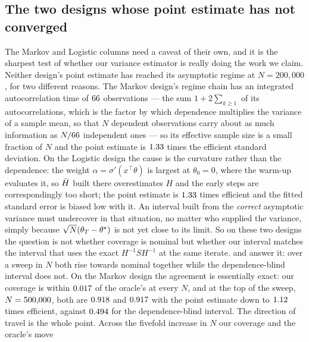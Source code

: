 
\subsection{The two designs whose point estimate has not converged}
\label{app:hard}

The Markov and Logistic columns need a caveat of their own, and it is the sharpest test of
whether our variance estimator is really doing the work we claim. Neither design's point estimate
has reached its asymptotic regime at $N=200{,}000$, for two different reasons. The Markov design's
regime chain has an integrated autocorrelation time of $66$ observations --- the sum
$1+2\sum_{k\ge1}$ of its autocorrelations, which is the factor by which dependence multiplies the
variance of a sample mean, so that $N$ dependent observations carry about as much information as
$N/66$ independent ones --- so its effective sample size is a small fraction of $N$ and the
point estimate is $1.33$ times the efficient standard deviation. On the Logistic design
the cause is the curvature rather than the dependence: the weight $\alpha=\sigma'(x^{\!\top}\theta)$
is largest at $\theta_0=0$, where the warm-up evaluates it, so $\bar{H}$ built there overestimates $H$
and the early steps are correspondingly too short; the point estimate is $1.33$
times efficient and the fitted standard error is biased low with it. An interval built from the
\emph{correct} asymptotic variance must undercover in that situation, no matter who supplied
the variance, simply because $\sqrt N(\theta_T-\theta^\star)$ is not yet close to its limit. So on these two designs the
question is not whether coverage is nominal but whether our interval matches the interval that
uses the exact $H^{-1}SH^{-1}$ at the same iterate.  and  answer it:
over a sweep in $N$ both rise towards nominal together while the dependence-blind interval does
not. On the Markov design the agreement is essentially exact: our coverage is within
$0.017$ of the oracle's at every $N$, and at the top of the sweep, $N=500{,}000$, both are
$0.918$ and $0.917$ with the point estimate down to $1.12$ times
efficient, against $0.494$ for the dependence-blind interval. The direction of travel
is the whole point. Across the fivefold increase in $N$ our coverage and the oracle's move
